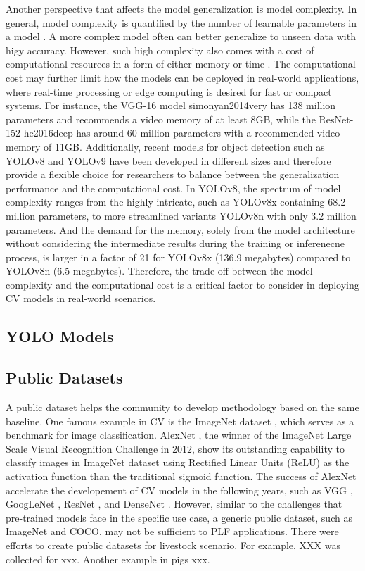 Another perspective that affects the model generalization is model complexity. In general, model complexity is quantified by the number of learnable parameters in a model \citep{}. A more complex model often can better generalize to unseen data with higy accuracy. However, such high complexity also comes with a cost of computational resources in a form of either memory or time \citep{}. The computational cost may further limit how the models can be deployed in real-world applications, where real-time processing or edge computing is desired for fast or compact systems. For instance, the VGG-16 model {simonyan2014very} has 138 million parameters and recommends a video memory of at least 8GB, while the ResNet-152 {he2016deep} has around 60 million parameters with a recommended video memory of 11GB. Additionally, recent models for object detection such as YOLOv8 \citep{} and YOLOv9 \citep{} have been developed in different sizes and therefore provide a flexible choice for researchers to balance between the generalization performance and the computational cost. In YOLOv8, the spectrum of model complexity ranges from the highly intricate, such as YOLOv8x containing 68.2 million parameters, to more streamlined variants YOLOv8n with only 3.2 million parameters. And the demand for the memory, solely from the model architecture without considering the intermediate results during the training or inferenecne process, is larger in a factor of 21 for YOLOv8x (136.9 megabytes) compared to YOLOv8n (6.5 megabytes). Therefore, the trade-off between the model complexity and the computational cost is a critical factor to consider in deploying CV models in real-world scenarios.

\subsection*{YOLO Models}

\subsection*{Public Datasets}

A public dataset helps the community to develop methodology based on the same baseline. One famous example in CV is the ImageNet dataset \citep{}, which serves as a benchmark for image classification. AlexNet \citep{}, the winner of the ImageNet Large Scale Visual Recognition Challenge in 2012, show its outstanding capability to classify images in ImageNet dataset using Rectified Linear Units (ReLU) as the activation function than the traditional sigmoid function. The success of AlexNet accelerate the developement of CV models in the following years, such as VGG \citep{}, GoogLeNet \citep{}, ResNet \citep{}, and DenseNet \citep{}. However, similar to the challenges that pre-trained models face in the specific use case, a generic public dataset, such as ImageNet and COCO, may not be sufficient to PLF applications. There  were efforts to create public datasets for livestock scenario. For example, XXX \citep{} was collected for xxx. Another example in pigs xxx.

